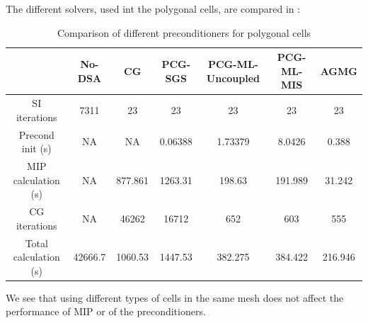 The different solvers, used int the polygonal cells, are compared in
:
\begin{table}[H]
  \begin{center}
    \caption{Comparison of different preconditioners for polygonal cells}
    \begin{tabular}{|c|c|c|c|c|c|c|}
      \hline
      & No-DSA & CG & PCG-SGS & PCG-ML-Uncoupled & PCG-ML-MIS & AGMG \\
      \hline
      SI iterations   & 7311    & 23      & 23      & 23      & 23      & 23 \\
   Precond init (s)   & NA      & NA      & 0.06388 & 1.73379 & 8.0426  & 0.388 \\
MIP calculation (s)   & NA      & 877.861 & 1263.31 & 198.63  & 191.989 &
      31.242 \\
      CG iterations   & NA      & 46262   & 16712   & 652     & 603     & 555 \\
Total calculation (s) & 42666.7 & 1060.53 & 1447.53 & 382.275 & 384.422 &
      216.946 \\
      \hline
    \end{tabular}
    \label{comparison_homog_poly}
  \end{center}
\end{table}
We see that using different types of cells in the same mesh does not affect
the performance of MIP or of the preconditioners.

